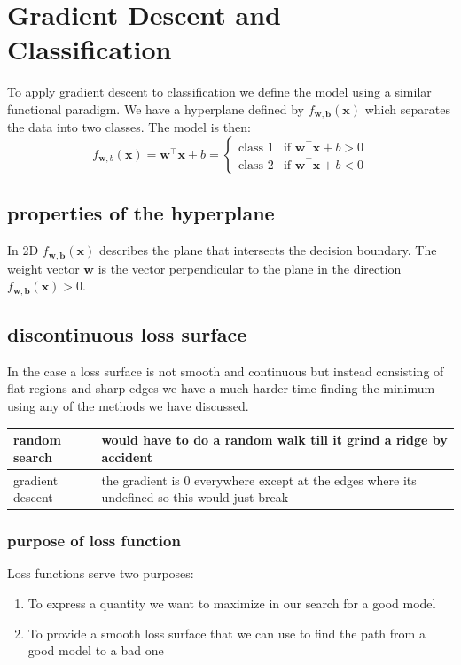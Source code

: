 \documentclass[12pt]{article}
\theoremstyle{definition}
\newcommand{\deft}[1]{
    \begin{center}
        \begin{tabular}{|M{3cm}|M{0.80\textwidth}|}
            \hline
            #1
            \hline %
        \end{tabular}
    \end{center}
}
\begin{document}
\section{Gradient Descent and Classification}

To apply gradient descent to classification we define the model using a similar functional paradigm. We have a hyperplane defined by $f_{\mathbf{w}, \mathbf{b}}(\mathbf{x})$ which separates the data into two classes. The model is then:
\begin{equation}
    f_{\mathbf{w}, b}(\mathbf{x}) = \mathbf{w}^\intercal \mathbf{x} + b = 
    \begin{cases}
        \text{class 1} & \text{if } \mathbf{w}^\intercal \mathbf{x} + b > 0 \\
        \text{class 2} & \text{if } \mathbf{w}^\intercal \mathbf{x} + b < 0
    \end{cases}
\end{equation}

\subsection{properties of the hyperplane}
In 2D $f_{\mathbf{w}, \mathbf{b}}(\mathbf{x})$ describes the plane that intersects the decision boundary. The weight vector $\mathbf{w}$ is the vector perpendicular to the plane in the direction $f_{\mathbf{w}, \mathbf{b}}(\mathbf{x}) > 0$. 

\subsection{discontinuous loss surface}

In the case a loss surface is not smooth and continuous but instead consisting of flat regions and sharp edges we have a much harder time finding the minimum using any of the methods we have discussed.
\deft{
    random search & would have to do a random walk till it grind a ridge by accident \\
    \hline 
    gradient descent & the gradient is 0 everywhere except at the edges where its undefined so this would just break \\
}

\subsubsection*{purpose of loss function}

Loss functions serve two purposes:
\begin{enumerate}[leftmargin=*, noitemsep]
    \item To express a quantity we want to maximize in our search for a good model 
    \item To provide a smooth loss surface that we can use to find the path from a good model to a bad one
\end{enumerate}
\end{document}
